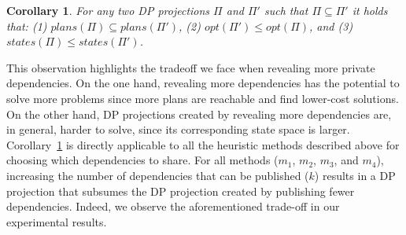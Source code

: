 \documentclass{article}
\newtheorem{corollary}{Corollary}
\newcommand{\guy}[1]{\textbf{\color{orange}[GUY:#1]}}
\theoremstyle{remark}
\begin{document}
\begin{corollary}
For any two DP projections $\Pi$ and $\Pi'$ such that $\Pi \subseteq \Pi'$ it holds that: (1) $plans(\Pi) \subseteq plans(\Pi')$, 
(2) $opt(\Pi')\leq opt(\Pi)$, 
and (3) $states(\Pi) \leq states(\Pi')$.
\label{theorem:solvability}
\end{corollary}
This observation highlights the tradeoff we face when revealing more private dependencies. On the one hand, revealing more dependencies has the potential to solve more problems since more plans are reachable and find lower-cost solutions. On the other hand, DP projections created by revealing more dependencies are, in general, harder to solve, since its corresponding state space is larger. 
Corollary~\ref{theorem:solvability} is directly applicable
to all the heuristic methods described above for choosing which dependencies to share. For all methods ($m_1$, $m_2$, $m_3$, and $m_4$), increasing the number of dependencies that can be published ($k$) results in a DP projection that subsumes the DP projection created by publishing fewer dependencies. Indeed, we observe the aforementioned trade-off in our experimental results. 
\end{document}
